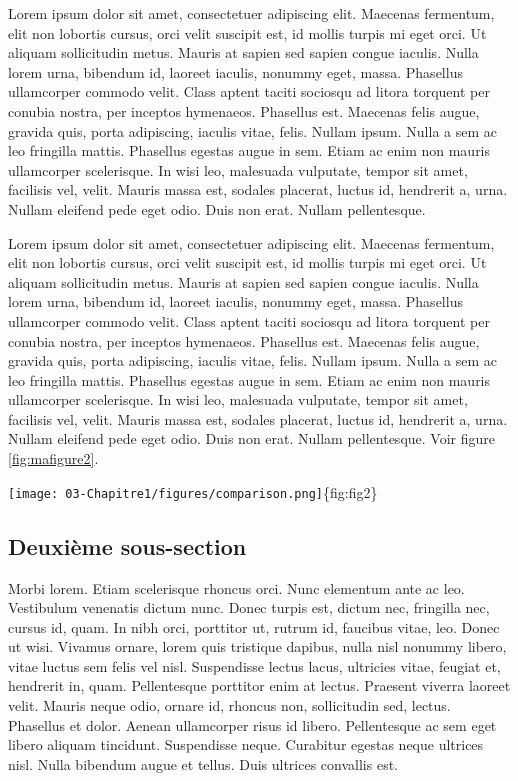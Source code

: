 Lorem ipsum dolor sit amet, consectetuer adipiscing elit. Maecenas
fermentum, elit non lobortis cursus, orci velit suscipit est, id mollis
turpis mi eget orci. Ut aliquam sollicitudin metus. Mauris at sapien sed
sapien congue iaculis. Nulla lorem urna, bibendum id, laoreet iaculis,
nonummy eget, massa. Phasellus ullamcorper commodo velit. Class aptent
taciti sociosqu ad litora torquent per conubia nostra, per inceptos
hymenaeos. Phasellus est. Maecenas felis augue, gravida quis, porta
adipiscing, iaculis vitae, felis. Nullam ipsum. Nulla a sem ac leo
fringilla mattis. Phasellus egestas augue in sem. Etiam ac enim non
mauris ullamcorper scelerisque. In wisi leo, malesuada vulputate, tempor
sit amet, facilisis vel, velit. Mauris massa est, sodales placerat,
luctus id, hendrerit a, urna. Nullam eleifend pede eget odio. Duis non
erat. Nullam pellentesque.

Lorem ipsum dolor sit amet, consectetuer adipiscing elit. Maecenas
fermentum, elit non lobortis cursus, orci velit suscipit est, id mollis
turpis mi eget orci. Ut aliquam sollicitudin metus. Mauris at sapien sed
sapien congue iaculis. Nulla lorem urna, bibendum id, laoreet iaculis,
nonummy eget, massa. Phasellus ullamcorper commodo velit. Class aptent
taciti sociosqu ad litora torquent per conubia nostra, per inceptos
hymenaeos. Phasellus est. Maecenas felis augue, gravida quis, porta
adipiscing, iaculis vitae, felis. Nullam ipsum. Nulla a sem ac leo
fringilla mattis. Phasellus egestas augue in sem. Etiam ac enim non
mauris ullamcorper scelerisque. In wisi leo, malesuada vulputate, tempor
sit amet, facilisis vel, velit. Mauris massa est, sodales placerat,
luctus id, hendrerit a, urna. Nullam eleifend pede eget odio. Duis non
erat. Nullam pellentesque. Voir figure \ref{fig:mafigure2}.

\texttt{[image: 03-Chapitre1/figures/comparison.png]}\{fig:fig2\}

\hypertarget{deuxiuxe8me-sous-section}{%
\subsection{Deuxième sous-section}\label{deuxiuxe8me-sous-section}}

Morbi lorem. Etiam scelerisque rhoncus orci. Nunc elementum ante ac leo.
Vestibulum venenatis dictum nunc. Donec turpis est, dictum nec,
fringilla nec, cursus id, quam. In nibh orci, porttitor ut, rutrum id,
faucibus vitae, leo. Donec ut wisi. Vivamus ornare, lorem quis tristique
dapibus, nulla nisl nonummy libero, vitae luctus sem felis vel nisl.
Suspendisse lectus lacus, ultricies vitae, feugiat et, hendrerit in,
quam. Pellentesque porttitor enim at lectus. Praesent viverra laoreet
velit. Mauris neque odio, ornare id, rhoncus non, sollicitudin sed,
lectus. Phasellus et dolor. Aenean ullamcorper risus id libero.
Pellentesque ac sem eget libero aliquam tincidunt. Suspendisse neque.
Curabitur egestas neque ultrices nisl. Nulla bibendum augue et tellus.
Duis ultrices convallis est.

